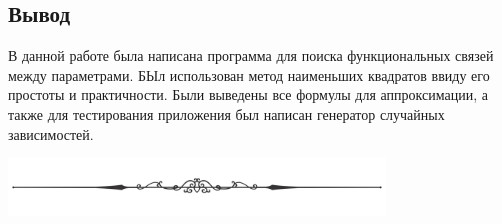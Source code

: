 \newpage
\subsection*{Вывод\\}

В данной работе была написана программа для поиска функциональных связей между параметрами. БЫл использован метод наименьших квадратов ввиду его простоты и практичности. Были выведены все формулы для аппроксимации, а также для тестирования приложения был написан генератор случайных зависимостей.

\vspace{0.5cm}

\begin{center}
    \includegraphics[width=0.75\textwidth]{Screenshots/line.png}
\end{center}